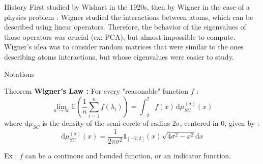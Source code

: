 \documentclass[10pt a4paper]{beamer}
\begin{document}
\begin{frame}{History}
First studied by Wishart in the 1920s, then by Wigner in the case of a physics problem : Wigner studied the interactions between atoms, which can be described using linear operators. Therefore, the behavior of the eigenvalues of those operators was crucial (ex: PCA), but almost impossible to compute. Wigner's idea was to consider random matrices that were 
similar to the ones describing atoms interactions, but whose eigenvalues were easier to study.
\end{frame}

\begin{frame}{Notations}

\end{frame}

\begin{frame}{Theorem}
\textbf{Wigner's Law : } For every "reasonable" function $f$ : 
\[ \lim_{n \to \infty} \mathbb{E}\left (\frac{1}{n} \sum_{i=1}^n f(\lambda_i)\right ) = \int_{-2}^2 f(x) \, \mathrm{d}\mu_{SC}^{(\sigma)}(x) \] where $\mathrm{d}\mu_{SC}$ is the density of the semi-cercle of radius $2\sigma$, centered in $0$, given by  : \[ \mathrm{d}\mu_{SC}^{(\sigma)}(x) =\frac{1}{2\pi{\sigma^2}}\mathds{1}_{[-2;2]}(x)\sqrt{4\sigma^2-x^2} \mathrm{d}x \]

Ex : $f$ can be a continous and bouded function, or an indicator function.
\end{frame}
\end{document}
